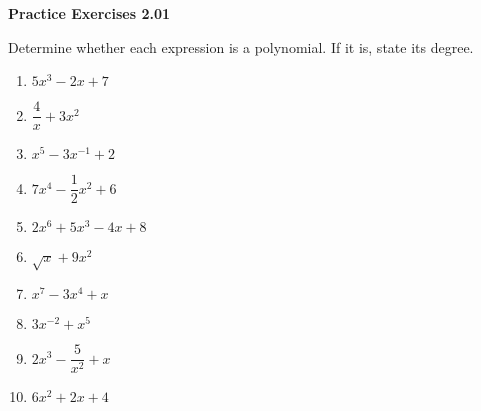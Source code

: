 \vspace{0.3ex}
\noindent\textbf{Practice Exercises 2.01}

\vspace{0.2ex}

Determine whether each expression is a polynomial. If it is, state its degree.
\begin{multicols}{2}
\begin{enumerate}
    \item $5x^3 - 2x + 7$
    \item $\dfrac{4}{x} + 3x^2$
    \item $x^5 - 3x^{-1} + 2$
    \item $7x^4 - \dfrac{1}{2}x^2 + 6$
    \item $2x^6 + 5x^3 - 4x + 8$
    \item $\sqrt{x} + 9x^2$
    \item $x^7 - 3x^4 + x$
    \item $3x^{-2} + x^5$
    \item $2x^3 - \dfrac{5}{x^2} + x$
    \item $6x^2 + 2x + 4$
\end{enumerate}
\end{multicols}
